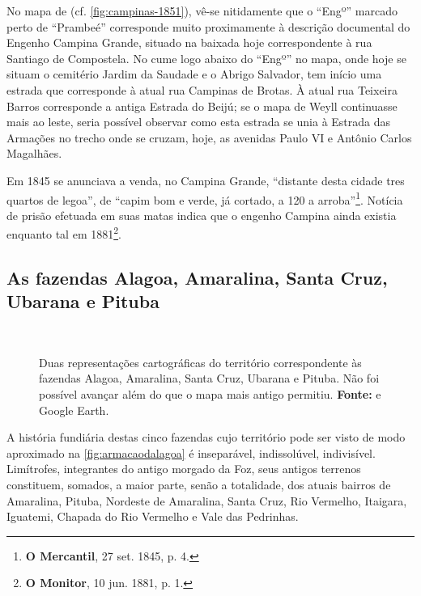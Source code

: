 No mapa de  (cf. \autoref{fig:campinas-1851}), vê-se nitidamente que o ``Engº'' marcado perto de ``Prambeé'' corresponde muito proximamente à descrição documental do Engenho Campina Grande, situado na baixada hoje correspondente à rua Santiago de Compostela. No cume logo abaixo do ``Engº'' no mapa, onde hoje se situam  o cemitério Jardim da Saudade e o Abrigo Salvador, tem início uma estrada que corresponde à atual rua Campinas de Brotas. À atual rua Teixeira Barros corresponde a antiga Estrada do Beijú; se o mapa de Weyll continuasse mais ao leste, seria possível observar como esta estrada se unia à Estrada das Armações no trecho onde se cruzam, hoje, as avenidas Paulo VI e Antônio Carlos Magalhães. 

Em 1845 se anunciava a venda, no Campina Grande, ``distante desta cidade tres quartos de legoa'', de ``capim bom e verde, já cortado, a 120 a arroba''\footnote{\textbf{O Mercantil}, 27 set. 1845, p. 4.}. Notícia de prisão efetuada em suas matas indica que o engenho Campina ainda existia enquanto tal em 1881\footnote{\textbf{O Monitor}, 10 jun. 1881, p. 1.}.

\subsection{As fazendas Alagoa, Amaralina, Santa Cruz, Ubarana e Pituba}

\begin{figure}[!htp]
\centering
{}
\  %
\caption{Duas representações cartográficas do território correspondente às fazendas Alagoa, Amaralina, Santa Cruz, Ubarana e Pituba. Não foi possível avançar além do que o mapa mais antigo permitiu. \textbf{Fonte:}  e Google Earth.}
\label{fig:armacaodalagoa}
\end{figure}

A história fundiária destas cinco fazendas cujo território pode ser visto de modo aproximado na \autoref{fig:armacaodalagoa} é inseparável, indissolúvel, indivisível. Limítrofes, integrantes do antigo morgado da Foz, seus antigos terrenos constituem, somados, a maior parte, senão a totalidade, dos atuais bairros de Amaralina, Pituba, Nordeste de Amaralina, Santa Cruz, Rio Vermelho, Itaigara, Iguatemi, Chapada do Rio Vermelho e Vale das Pedrinhas.

